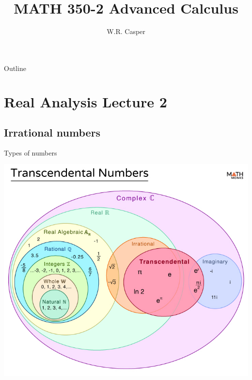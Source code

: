 \documentclass{beamer}
\title{MATH 350-2 Advanced Calculus}
\subtitle
{} %
\author[W.R. Casper] %
{W.R. Casper}
\institute[California State University Fullerton] %
{
  Department of Mathematics\\
  California State University Fullerton}
\begin{document}
\begin{frame}
  \titlepage
\end{frame}

\begin{frame}{Outline}
  \tableofcontents
\end{frame}



\section{Real Analysis Lecture 2}

\subsection{Irrational numbers}
\begin{frame}{Types of numbers}
\begin{center}
\includegraphics[width=0.8\linewidth]{fig/numbers}
\end{center}
\end{frame}
\end{document}
